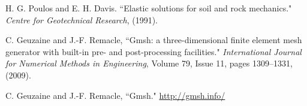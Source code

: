 \documentclass[a4]{article}
\begin{document}
\FloatBarrier

\begin{thebibliography}{99}
	
	 H. G. Poulos and E. H. Davis. ``Elastic solutions for soil and rock mechanics." \textit{Centre for Geotechnical Research}, (1991).

	 C. Geuzaine and J.-F. Remacle, ``Gmsh: a three-dimensional finite element mesh generator with built-in pre- and post-processing facilities." \textit{International Journal for Numerical Methods in Engineering}, Volume 79, Issue 11, pages 1309--1331, (2009).
	
	 C. Geuzaine and J.-F. Remacle, ``Gmsh." \url{http://gmsh.info/}

\end{thebibliography}
\end{document}
